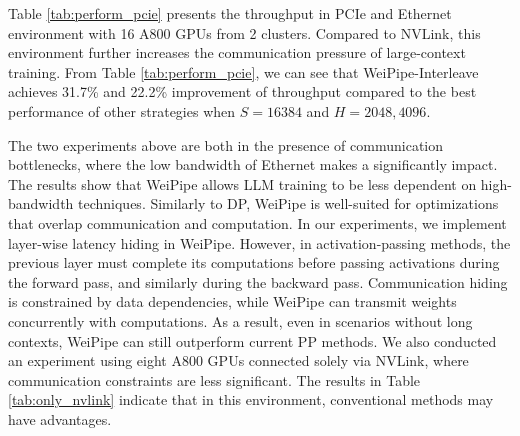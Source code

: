 \documentclass[sigplan,screen]{acmart}
\begin{document}
Table \ref{tab:perform_pcie} presents the throughput in PCIe and Ethernet environment with 16 A800 GPUs from 2 clusters. Compared to NVLink, this environment further increases the communication pressure of large-context training. From Table \ref{tab:perform_pcie}, we can see that WeiPipe-Interleave achieves 31.7\% and 22.2\% improvement of throughput compared to the best performance of other strategies when $S=16384$ and $H=2048, 4096$. 

The two experiments above are both in the presence of communication bottlenecks, where the low bandwidth of Ethernet makes a significantly impact. The results show that WeiPipe allows LLM training to be less dependent on high-bandwidth techniques. Similarly to DP, WeiPipe is well-suited for optimizations that overlap communication and computation. In our experiments, we implement layer-wise latency hiding in WeiPipe. However, in activation-passing methods, the previous layer must complete its computations before passing activations during the forward pass, and similarly during the backward pass. Communication hiding is constrained by data dependencies, while WeiPipe can transmit weights concurrently with computations. As a result, even in scenarios without long contexts, WeiPipe can still outperform current PP methods. We also conducted an experiment using eight A800 GPUs connected solely via NVLink, where communication constraints are less significant. The results in Table \ref{tab:only_nvlink} indicate that in this environment, conventional methods may have advantages.



\end{document}
